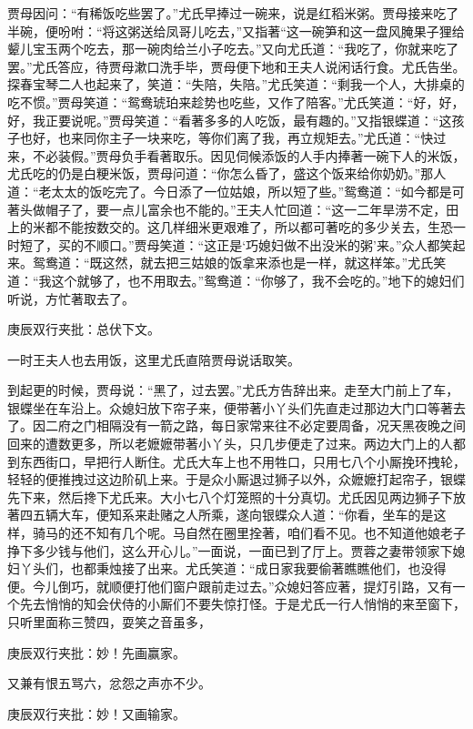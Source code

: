 \begin{parag}
    贾母因问：“有稀饭吃些罢了。”尤氏早捧过一碗来，说是红稻米粥。贾母接来吃了半碗，便吩咐：“将这粥送给凤哥儿吃去，”又指著“这一碗笋和这一盘风腌果子狸给颦儿宝玉两个吃去，那一碗肉给兰小子吃去。”又向尤氏道：“我吃了，你就来吃了罢。”尤氏答应，待贾母漱口洗手毕，贾母便下地和王夫人说闲话行食。尤氏告坐。探春宝琴二人也起来了，笑道：“失陪，失陪。”尤氏笑道：“剩我一个人，大排桌的吃不惯。”贾母笑道：“鸳鸯琥珀来趁势也吃些，又作了陪客。”尤氏笑道：“好，好，好，我正要说呢。”贾母笑道：“看著多多的人吃饭，最有趣的。”又指银蝶道：“这孩子也好，也来同你主子一块来吃，等你们离了我，再立规矩去。”尤氏道：“快过来，不必装假。”贾母负手看著取乐。因见伺候添饭的人手内捧著一碗下人的米饭，尤氏吃的仍是白粳米饭，贾母问道：“你怎么昏了，盛这个饭来给你奶奶。”那人道：“老太太的饭吃完了。今日添了一位姑娘，所以短了些。”鸳鸯道：“如今都是可著头做帽子了，要一点儿富余也不能的。”王夫人忙回道：“这一二年旱涝不定，田上的米都不能按数交的。这几样细米更艰难了，所以都可著吃的多少关去，生恐一时短了，买的不顺口。”贾母笑道：“这正是‘巧媳妇做不出没米的粥’来。”众人都笑起来。鸳鸯道：“既这然，就去把三姑娘的饭拿来添也是一样，就这样笨。”尤氏笑道：“我这个就够了，也不用取去。”鸳鸯道：“你够了，我不会吃的。”地下的媳妇们听说，方忙著取去了。\begin{note}庚辰双行夹批：总伏下文。\end{note}一时王夫人也去用饭，这里尤氏直陪贾母说话取笑。
\end{parag}


\begin{parag}
    到起更的时候，贾母说：“黑了，过去罢。”尤氏方告辞出来。走至大门前上了车，银蝶坐在车沿上。众媳妇放下帘子来，便带著小丫头们先直走过那边大门口等著去了。因二府之门相隔没有一箭之路，每日家常来往不必定要周备，况天黑夜晚之间回来的遭数更多，所以老嬷嬷带著小丫头，只几步便走了过来。两边大门上的人都到东西街口，早把行人断住。尤氏大车上也不用牲口，只用七八个小厮挽环拽轮，轻轻的便推拽过这边阶矶上来。于是众小厮退过狮子以外，众嬷嬷打起帘子，银蝶先下来，然后搀下尤氏来。大小七八个灯笼照的十分真切。尤氏因见两边狮子下放著四五辆大车，便知系来赴赌之人所乘，遂向银蝶众人道：“你看，坐车的是这样，骑马的还不知有几个呢。马自然在圈里拴著，咱们看不见。也不知道他娘老子挣下多少钱与他们，这么开心儿。”一面说，一面已到了厅上。贾蓉之妻带领家下媳妇丫头们，也都秉烛接了出来。尤氏笑道：“成日家我要偷著瞧瞧他们，也没得便。今儿倒巧，就顺便打他们窗户跟前走过去。”众媳妇答应著，提灯引路，又有一个先去悄悄的知会伏侍的小厮们不要失惊打怪。于是尤氏一行人悄悄的来至窗下，只听里面称三赞四，耍笑之音虽多，\begin{note}庚辰双行夹批：妙！先画赢家。\end{note}又兼有恨五骂六，忿怨之声亦不少。\begin{note}庚辰双行夹批：妙！又画输家。\end{note}
\end{parag}


